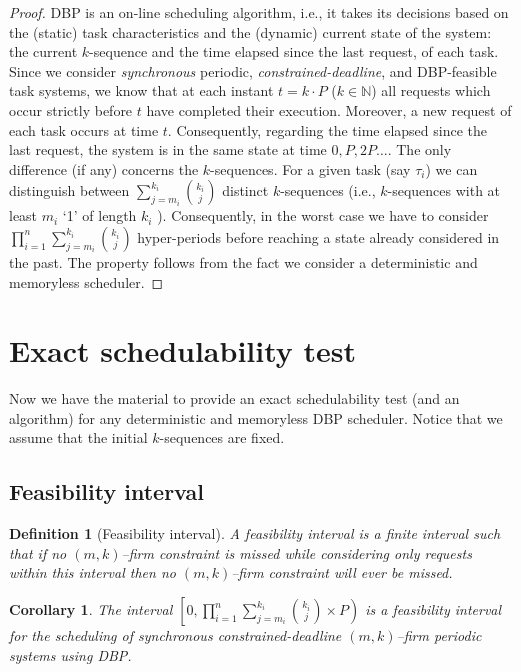 \documentclass{article}
\newtheorem{Definition}{Definition}
\newtheorem{Corollary}[Theorem]{Corollary}
\begin{document}
\begin{proof}
DBP is an on-line scheduling algorithm, i.e., it takes its decisions based on the (static) task characteristics and the (dynamic) current state of the system: the current $k$-sequence and the time elapsed since the last request, of each task. Since we consider \emph{synchronous} periodic, \emph{constrained-deadline}, and  DBP-feasible task systems, we know that at each instant $t = k \cdot P$ ($k \in \mathbb{N}$) all requests which occur strictly before $t$ have completed their execution. Moreover, a new request of each task occurs at time $t$. Consequently, regarding the time elapsed since the last request, the system is in the same state at time $0, P, 2P\ldots$. The only difference (if any) concerns the $k$-sequences. For a given task (say $\tau_{i}$) we can distinguish between $\sum_{j=m_{i}}^{k_{i}} {k_{i}\choose j}$ distinct $k$-sequences (i.e., $k$-sequences with at least $m_{i}$ `1' of length $k_{i}$ ). Consequently, in the worst case we have to consider $\prod_{i=1}^{n} \sum_{j=m_{i}}^{k_{i}} {k_{i}\choose j}$ hyper-periods before reaching a state already considered in the past. The property follows from the fact we consider a deterministic and memoryless scheduler.
\end{proof}

\section{Exact schedulability test}\label{sec:exacttest}

Now we have the material to provide an exact schedulability test (and an algorithm) for any deterministic and memoryless DBP scheduler. Notice that we assume that the initial $k$-sequences are fixed.

\subsection{Feasibility interval}

\begin{Definition}[Feasibility interval]
  A \emph{feasibility interval} is a finite interval such that if no $(m,k)$--firm constraint is missed  while considering only requests within this interval then no
  $(m,k)$--firm constraint will ever be missed.
\end{Definition}

\begin{Corollary}\label{coro:interval}
The interval $\left[0, \prod_{i=1}^{n} \sum_{j=m_{i}}^{k_{i}}{k_{i}\choose j}\times P\right)$ is a feasibility interval for the scheduling of synchronous constrained-deadline $(m,k)$--firm periodic systems using DBP.
\end{Corollary}
\end{document}
